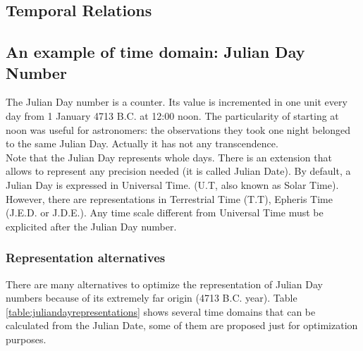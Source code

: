 \subsection{Temporal Relations}



\subsection{An example of time domain: Julian Day Number}

The Julian Day number \cite{Dir96} is a counter. Its value is incremented in one unit every day from 1 January 4713 B.C. at 12:00 noon. The particularity of starting at noon was useful for astronomers: the observations they took one night belonged to the same Julian Day. Actually it has not any transcendence.\\
Note that the Julian Day represents whole days. There is an extension that allows to represent any precision needed (it is called Julian Date). By default, a Julian Day is expressed in Universal Time. (U.T, also known as Solar Time). However, there are representations in Terrestrial Time (T.T), Epheris Time (J.E.D. or J.D.E.). Any time scale different from Universal Time must be explicited after the Julian Day number.\\

\subsubsection{Representation alternatives}
There are many alternatives to optimize the representation of Julian Day numbers because of its extremely far origin (4713 B.C. year). Table \ref{table:juliandayrepresentations} shows several time domains that can be calculated from the Julian Date, some of them are proposed just for optimization purposes.


